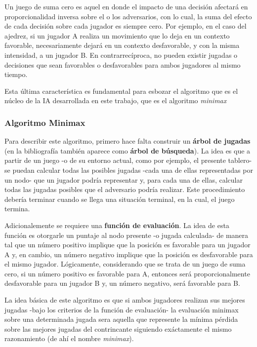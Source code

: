 \documentclass{llncs}
\begin{document}
Un juego de suma cero es aquel en donde el impacto de una decisión afectará en proporcionalidad inversa sobre el o los adversarios, con lo cual, la suma del efecto de cada decisión sobre cada jugador es siempre cero. Por ejemplo, en el caso del ajedrez, si un jugador A realiza un movimiento que lo deja en un contexto favorable, necesariamente dejará en un contexto desfavorable, y con la misma intensidad, a un jugador B. En contrarrecíproca, no pueden existir jugadas o decisiones que sean favorables o desfavorables para ambos jugadores al mismo tiempo.

Esta última característica es fundamental para esbozar el algoritmo que es el núcleo de la IA desarrollada en este trabajo, que es el algoritmo \textit{minimax}

\subsubsection{ Algoritmo Minimax }

Para describir este algoritmo, primero hace falta construir un \textbf{árbol de jugadas} (en la bibliografía también aparece como \textbf{árbol de búsqueda}). La idea es que a partir de un juego -o de su entorno actual, como por ejemplo, el presente tablero- se puedan calcular todas las posibles jugadas -cada una de ellas representadas por un nodo- que un jugador podría representar y, para cada una de ellas, calcular todas las jugadas posibles que el adversario podría realizar. Este procedimiento debería terminar cuando se llega una situación terminal, en la cual, el juego termina.

Adicionalemente se requiere una \textbf{función de evaluación}. La idea de esta función es otorgarle un puntaje al nodo presente -o jugada calculada- de manera tal que un número positivo implique que la posición es favorable para un jugador A y, en cambio, un número negativo implique que la posición es desfavorable para el mismo jugador. Lógicamente, considerando que se trata de un juego de suma cero, si un número positivo es favorable para A, entonces será proporcionalmente desfavorable para un jugador B y, un número negativo, será favorable para B.

La idea básica de este algoritmo es que si ambos jugadores realizan sus mejores jugadas -bajo los criterios de la función de evaluación- la evaluación minimax sobre una determinada jugada sera aquella que represente la mínima pérdida sobre las mejores jugadas del contrincante siguiendo exáctamente el mismo razonamiento (de ahí el nombre \textit{minimax}).
\end{document}
